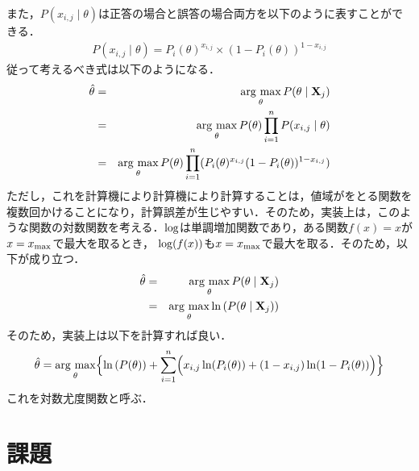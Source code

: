 \documentclass[12pt]{jarticle}
\begin{document}
また，$P(x_{i,j}\mid \theta)$は正答の場合と誤答の場合両方を以下のように表すことができる．
\begin{eqnarray}
    P(x_{i,j}\mid \theta)=P_i(\theta)^{x_{i,j}}\times (1-P_i(\theta))^{1-x_{i,j}}
\end{eqnarray}
従って考えるべき式は以下のようになる．
\begin{eqnarray}
    \hat{\theta}&=& \mathop{\rm arg~max}\limits_{\theta} P(\theta \mid {\bf X}_j)\\
    &=& \mathop{\rm arg~max}\limits_{\theta} P(\theta)\prod_{i=1}^n P(x_{i,j} \mid \theta)\\
    &=& \mathop{\rm arg~max}\limits_{\theta} P(\theta)\prod_{i=1}^n (P_i(\theta)^{x_{i,j}}(1-P_i(\theta))^{1-x_{i,j}})
\end{eqnarray}
ただし，これを計算機により計算機により計算することは，値域がをとる関数を複数回かけることになり，計算誤差が生じやすい．そのため，実装上は，このような関数の対数関数を考える．${\rm log}$は単調増加関数であり，ある関数$f(x)=x$が$x=x_{\rm max}$で最大を取るとき， ${\rm log}(f(x))$も$x=x_{\rm max}$で最大を取る．そのため，以下が成り立つ．
\begin{eqnarray}
    \hat{\theta}&=& \mathop{\rm arg~max}\limits_{\theta} P(\theta \mid {\bf X}_j)\\
    &=& \mathop{\rm arg~max}\limits_{\theta} \ln{(P(\theta \mid {\bf X}_j))}
\end{eqnarray}
そのため，実装上は以下を計算すれば良い．
\begin{eqnarray}
    \hat{\theta}=\mathop{\rm arg~max}\limits_{\theta} \Bigl\{\ln{(P(\theta))+\sum_{i=1}^n \Bigl(x_{i,j}\ln(P_i(\theta))+(1-x_{i,j})\ln(1-P_i(\theta))\Bigr)}\Bigr\}
\end{eqnarray}
これを対数尤度関数と呼ぶ．
\section{課題}
\end{document}
